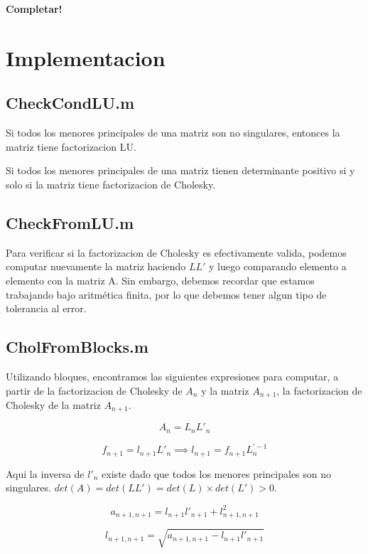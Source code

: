 \documentclass[10pt,a4paper]{article}
\begin{document}
\textbf{Completar!}

\pagebreak

\section{Implementacion}

\subsection{CheckCondLU.m}

Si todos los menores principales de una matriz son no singulares, entonces la matriz tiene factorizacion LU.

Si todos los menores principales de una matriz tienen determinante positivo si y solo si la matriz tiene factorizacion de Cholesky.

\subsection{CheckFromLU.m}

Para verificar si la factorizacion de Cholesky es efectivamente valida, podemos computar nuevamente la matriz haciendo $LL'$ y luego comparando elemento a elemento con la matriz A. Sin embargo, debemos recordar que estamos trabajando bajo aritmética finita, por lo que debemos tener algun tipo de tolerancia al error.

\subsection{CholFromBlocks.m}

Utilizando bloques, encontramos las siguientes expresiones para computar, a partir de la factorizacion de Cholesky de $A_n$ y la matriz $A_{n+1}$, la factorizacion de Cholesky de la matriz $A_{n+1}$.

\begin{equation}
A_n = L_n L'_n
\end{equation}

\begin{equation}
f_{n+1} = l_{n+1} L'_n \implies l_{n+1} = f_{n+1} L_n^{'-1}
\end{equation}

Aqui la inversa de $l'_n$ existe dado que todos los menores principales son no singulares. $det(A) = det(LL') = det(L) \times det(L') > 0$.

\begin{equation}
a_{n+1,n+1} = l_{n+1} l'_{n+1} + l_{n+1,n+1}^2
\end{equation}

\begin{equation}
l_{n+1,n+1} = \sqrt{a_{n+1,n+1} - l_{n+1} l'_{n+1}}
\end{equation}
\end{document}
